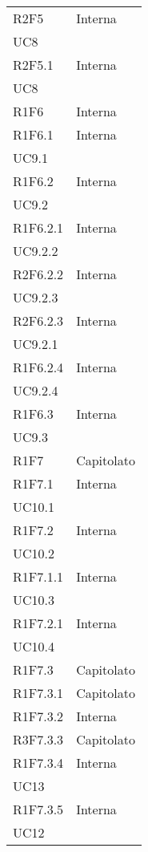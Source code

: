 \begin{longtable}{|C{6.5cm}|C{6.5cm}|}
	R2F5 &  \centering Interna \\ UC8 \tabularnewline

	R2F5.1 &  \centering Interna \\ UC8 \tabularnewline

	R1F6 & Interna \\

	R1F6.1 & \centering Interna \\ UC9.1 \tabularnewline

	R1F6.2 & \centering Interna \\ UC9.2 \tabularnewline

	R1F6.2.1 & \centering Interna \\ UC9.2.2 \tabularnewline

	R2F6.2.2 & \centering Interna \\ UC9.2.3 \tabularnewline

	R2F6.2.3 & \centering Interna \\ UC9.2.1 \tabularnewline

	R1F6.2.4 & \centering Interna \\ UC9.2.4 \tabularnewline

	R1F6.3 & \centering Interna \\ UC9.3 \tabularnewline

	R1F7 & Capitolato \\

	R1F7.1 & \centering Interna \\ UC10.1 \tabularnewline

	R1F7.2 &  \centering Interna \\ UC10.2 \tabularnewline

	R1F7.1.1 & \centering Interna \\ UC10.3 \tabularnewline

	R1F7.2.1 &   \centering Interna \\ UC10.4 \tabularnewline

	R1F7.3 &   Capitolato \\

	R1F7.3.1 &  Capitolato \\

	R1F7.3.2 &  Interna \\

	R3F7.3.3 &  Capitolato \\

	R1F7.3.4 &  \centering Interna \\ UC13 \tabularnewline

	R1F7.3.5 & \centering Interna \\ UC12 \tabularnewline


\end{longtable}

